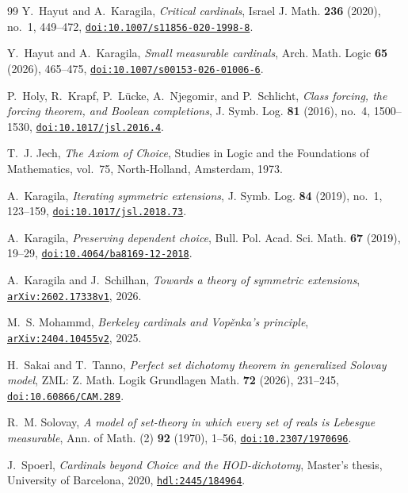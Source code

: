 \documentclass[11pt,a4paper]{amsart}
\theoremstyle{plain}
\theoremstyle{definition}
\theoremstyle{remark}
\begin{document}
\begin{thebibliography}{99}
Y.~Hayut and A.~Karagila,
\emph{Critical cardinals},
Israel J. Math. \textbf{236} (2020), no.~1, 449--472,
\href{https://doi.org/10.1007/s11856-020-1998-8}{\nolinkurl{doi:10.1007/s11856-020-1998-8}}.

Y.~Hayut and A.~Karagila,
\emph{Small measurable cardinals},
Arch. Math. Logic \textbf{65} (2026), 465--475,
\href{https://doi.org/10.1007/s00153-026-01006-6}{\nolinkurl{doi:10.1007/s00153-026-01006-6}}.

P.~Holy, R.~Krapf, P.~L\"ucke, A.~Njegomir, and P.~Schlicht,
\emph{Class forcing, the forcing theorem, and Boolean completions},
J. Symb. Log. \textbf{81} (2016), no.~4, 1500--1530,
\href{https://doi.org/10.1017/jsl.2016.4}{\nolinkurl{doi:10.1017/jsl.2016.4}}.

T.~J. Jech,
\emph{The Axiom of Choice},
Studies in Logic and the Foundations of Mathematics, vol.~75,
North-Holland, Amsterdam, 1973.

A.~Karagila,
\emph{Iterating symmetric extensions},
J. Symb. Log. \textbf{84} (2019), no.~1, 123--159,
\href{https://doi.org/10.1017/jsl.2018.73}{\nolinkurl{doi:10.1017/jsl.2018.73}}.

A.~Karagila,
\emph{Preserving dependent choice},
Bull. Pol. Acad. Sci. Math. \textbf{67} (2019), 19--29,
\href{https://doi.org/10.4064/ba8169-12-2018}{\nolinkurl{doi:10.4064/ba8169-12-2018}}.

A.~Karagila and J.~Schilhan,
\emph{Towards a theory of symmetric extensions},
\href{https://arxiv.org/abs/2602.17338}{\nolinkurl{arXiv:2602.17338v1}}, 2026.

M.~S. Mohammd,
\emph{Berkeley cardinals and Vop\v{e}nka's principle},
\href{https://arxiv.org/abs/2404.10455v2}{\nolinkurl{arXiv:2404.10455v2}}, 2025.

H.~Sakai and T.~Tanno,
\emph{Perfect set dichotomy theorem in generalized Solovay model},
ZML: Z. Math. Logik Grundlagen Math. \textbf{72} (2026), 231--245,
\href{https://doi.org/10.60866/CAM.289}{\nolinkurl{doi:10.60866/CAM.289}}.

R.~M. Solovay,
\emph{A model of set-theory in which every set of reals is Lebesgue measurable},
Ann. of Math. (2) \textbf{92} (1970), 1--56,
\href{https://doi.org/10.2307/1970696}{\nolinkurl{doi:10.2307/1970696}}.

J.~Spoerl,
\emph{Cardinals beyond Choice and the HOD-dichotomy},
Master's thesis, University of Barcelona, 2020,
\href{https://hdl.handle.net/2445/184964}{\nolinkurl{hdl:2445/184964}}.


\end{thebibliography}
\end{document}
